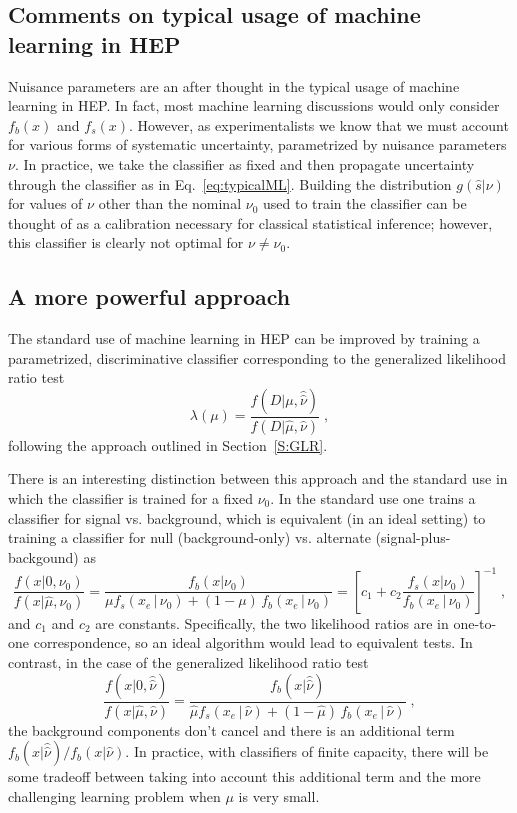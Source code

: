 \documentclass[11pt, oneside]{article}   	%
\begin{document}
\subsection{Comments on typical usage of machine learning in HEP}

Nuisance parameters are an after thought in the typical usage of machine learning in HEP. In fact, most machine learning discussions would only consider $f_b(x)$ and $f_s(x)$. However, as experimentalists we know that we must account for various forms of systematic uncertainty, parametrized by nuisance parameters $\nu$. In practice, we take the classifier as fixed and then propagate uncertainty through the classifier as in Eq.~\ref{eq:typicalML}. Building the distribution $g(\hat s|\nu)$ for values of $\nu$ other than the nominal $\nu_0$ used to train the classifier can be thought of as a calibration necessary for classical statistical inference; however, this classifier is clearly not optimal for $\nu \ne \nu_0$.

\subsection{A more powerful  approach}

The standard use of machine learning in HEP can be improved by training a parametrized, discriminative classifier corresponding to the generalized likelihood ratio test 
\begin{equation}
\lambda(\mu) = \frac{f(D|\mu, \hat{\hat{\nu}})}{f(D|\hat \mu, {\hat{\nu}})} \;,
\end{equation}
following the approach outlined in Section~\ref{S:GLR}. 

There is an interesting distinction between this approach and the standard use in which the classifier is trained for a fixed $\nu_0$. In the standard use one trains a classifier for signal vs. background, which is equivalent (in an ideal setting) to training a classifier for  null (background-only) vs. alternate (signal-plus-backgound) as 
\begin{equation}
 \frac{f(x| 0, \nu_0)}{f(x|\hat \mu, \nu_0)} =  \frac{f_b(x| \nu_0)}{ \mu f_s( x_e \, |\,  \nu_0)  + (1-\mu)\, f_b( x_e \,|\, \nu_0)} = \left[ c_1 + c_2   \frac{f_s(x| \nu_0)}{ f_b( x_e \,|\, \nu_0)} \right ]^{-1} \; ,
\end{equation}
and $c_1$ and $c_2$ are constants. Specifically, the two  likelihood ratios are in one-to-one correspondence, so an ideal algorithm would lead to equivalent tests. In contrast, in the case of the generalized likelihood ratio test 
\begin{equation}
 \frac{f(x| 0, \hat{\hat{ \nu}})}{f(x|\hat \mu, \hat\nu)} =  \frac{f_b(x| \hat{\hat{ \nu}})}{ \hat \mu f_s( x_e \, |\,  \hat\nu)  + (1- \hat \mu )\, f_b( x_e \,|\, \hat \nu)} \; ,
\end{equation}
the background components don't cancel and there is an additional term $f_b(x| \hat{\hat{ \nu}})/f_b(x| {\hat{ \nu}})$.
In practice, with classifiers of finite capacity, there will be some tradeoff between taking into account this additional term and the more challenging learning problem when $\mu$ is very small. 
\end{document}
